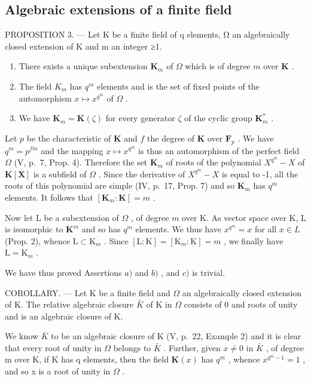 \subsection{Algebraic extensions of a finite field}

PROPOSITION 3. --- Let K be a finite field of q elements, Ω an algebraically closed extension of K and m an integer ≥1.

\begin{enumerate}
\def\labelenumi{\alph{enumi})}
\item
  There exists a unique subextension \(\mathbf{K}_m\) of \(\Omega\) which is of degree \(m\) over \(\mathbf{K}\) .
\item
  The field \(K_{m}\) has \(q^{m}\) elements and is the set of fixed points of the automorphism \(x \mapsto x^{q^{m}}\) of \(\Omega\) .
\item
  We have \(\mathbf{K}_m = \mathbf{K}(\zeta)\) for every generator \(\zeta\) of the cyclic group \(\mathbf{K}_m^*\) .
\end{enumerate}

Let \(p\) be the characteristic of \(\mathbf{K}\) and \(f\) the degree of \(\mathbf{K}\) over \(\mathbf{F}_p\) . We have \(q^m = p^{fm}\) and the mapping \(x \mapsto x^{q^m}\) is thus an automorphism of the perfect field \(\Omega\) (V, p.~7, Prop. 4). Therefore the set \(\mathbf{K}_m\) of roots of the polynomial \(X^{q^m} - X\) of \(\mathbf{K}[\mathbf{X}]\) is a subfield of \(\Omega\) . Since the derivative of \(X^{q^m} - X\) is equal to -1, all the roots of this polynomial are simple (IV, p.~17, Prop. 7) and so \(\mathbf{K}_m\) has \(q^m\) elements. It follows that \([\mathbf{K}_m : \mathbf{K}] = m\) .

Now let L be a subextension of \(\Omega\) , of degree \(m\) over K. As vector space over K, L is isomorphic to \(\mathbf{K}^m\) and so has \(q^m\) elements. We thus have \(x^{q^m} = x\) for all \(x \in L\) (Prop. 2), whence \(\mathrm{L} \subset \mathrm{K}_m\) . Since \([\mathrm{L} : \mathrm{K}] = [\mathrm{K}_m : \mathrm{K}] = m\) , we finally have \(\mathrm{L} = \mathrm{K}_m\) .

We have thus proved Assertions \(a)\) and \(b)\) , and \(c)\) is trivial.

COROLLARY. --- Let K be a finite field and \(\Omega\) an algebraically closed extension of K. The relative algebraic closure \(\bar{K}\) of K in \(\Omega\) consists of 0 and roots of unity and is an algebraic closure of K.

We know \(\bar{K}\) to be an algebraic closure of K (V, p.~22, Example 2) and it is clear that every root of unity in \(\Omega\) belongs to \(\bar{K}\) . Further, given \(x \neq 0\) in \(\bar{K}\) , of degree m over K, if K has q elements, then the field \(\mathbf{K}(x)\) has \(q^{m}\) , whence \(x^{q^{m}-1} = 1\) , and so x is a root of unity in \(\Omega\) .

